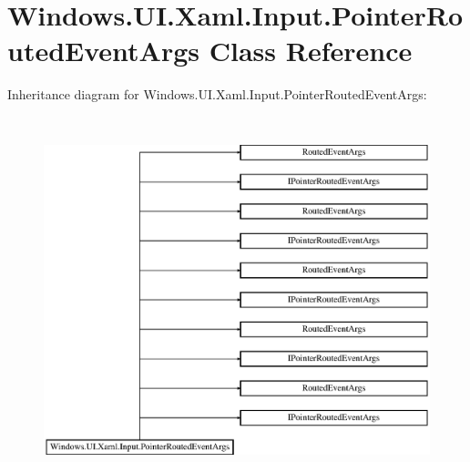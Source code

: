 \hypertarget{class_windows_1_1_u_i_1_1_xaml_1_1_input_1_1_pointer_routed_event_args}{}\section{Windows.\+U\+I.\+Xaml.\+Input.\+Pointer\+Routed\+Event\+Args Class Reference}
\label{class_windows_1_1_u_i_1_1_xaml_1_1_input_1_1_pointer_routed_event_args}
Inheritance diagram for Windows.\+U\+I.\+Xaml.\+Input.\+Pointer\+Routed\+Event\+Args\+:\begin{figure}[H]
\begin{center}
\leavevmode
\includegraphics[height=10.620689cm]{class_windows_1_1_u_i_1_1_xaml_1_1_input_1_1_pointer_routed_event_args}
\end{center}
\end{figure}
